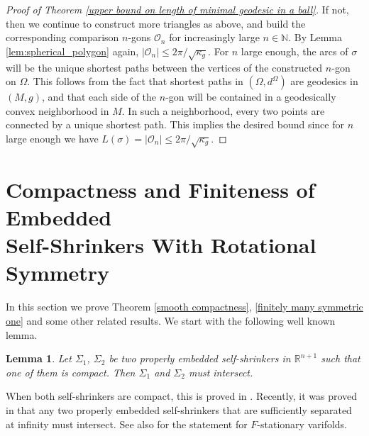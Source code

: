 \documentclass[12pt]{amsart}
\numberwithin{equation}{section}
\newtheorem{lem}[thm]{Lemma}
\theoremstyle{remark}
\begin{document}
\begin{proof} [Proof of Theorem \ref{upper bound on length of minimal geodesic in a ball}]
		If not, then we continue to construct more triangles as above, and build the corresponding comparison $n$-gons $\mathcal{O}_n$ for increasingly large $n\in \mathbb{N}$. By Lemma \ref{lem:spherical_polygon} again, $|\mathcal{O}_n|\leq 2\pi/\sqrt{\kappa_g}$. For $n$ large enough, the arcs of $\sigma$ will be the unique shortest paths between the vertices of the constructed $n$-gon on $\Omega$. This follows from the fact that shortest paths in  $(\Omega, d^\Omega)$ are geodesics in $(M,g)$, and that each side of the $n$-gon will be contained in a geodesically convex neighborhood in $M$. In such a neighborhood, every two points are connected by a unique shortest path. This implies the desired bound since for $n$ large enough we have $L(\sigma)= |\mathcal O_n| \leq 2\pi /\sqrt{\kappa_g}$.
		
		
	\end{proof}
	
	
	
	\section{Compactness and Finiteness of Embedded\\ Self-Shrinkers With Rotational Symmetry} \label{section smooth compactness}
	In this section we prove Theorem \ref{smooth compactness}, \ref{finitely many symmetric one} and some other related results. We start with the following well known lemma.
	\begin{lem} \label{all self-shrinkers intersect}
		Let $\Sigma_1$, $\Sigma_2$ be two properly embedded self-shrinkers in $\mathbb R^{n+1}$ such that one of them is compact. Then $\Sigma_1$ and $\Sigma_2$ must intersect.
	\end{lem}
	
	When both self-shrinkers are compact, this is proved in \cite[Theorem 7.4]{WW}. Recently, it was proved in \cite{IPR} that any two properly embedded self-shrinkers that are sufficiently separated at infinity must intersect. See also \cite[Corollary C.4]{ CCMS} for the statement for $F$-stationary varifolds. 
	
\end{document}
